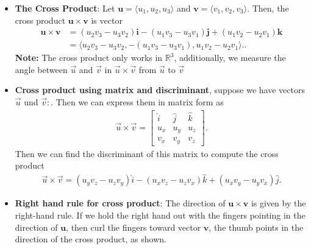 \documentclass{report}
\begin{document}
\begin{itemize}
            \item \textbf{The Cross Product}: 
                Let $\mathbf{u} = \langle u_1, u_2, u_3 \rangle$ and $\mathbf{v} = \langle v_1, v_2, v_3 \rangle$.
                Then, the cross product $\mathbf{u} \times \mathbf{v}$ is vector
                \begin{align*}
                    \mathbf{u} \times \mathbf{v} &= (u_2 v_3 - u_3 v_2) \mathbf{i} - (u_1 v_3 - u_3 v_1) \mathbf{j} + (u_1 v_2 - u_2 v_1) \mathbf{k}  \\
                                                 &= \langle u_2 v_3 - u_3 v_2, -(u_1 v_3 - u_3 v_1), u_1 v_2 - u_2 v_1 \rangle.
                .\end{align*}
                \bigbreak \noindent 
                \textbf{Note:} The cross product only works in $\mathbb{R}^{3}$, additionally, we measure the angle between $\vec{u}$ and $\vec{v}$ in $\vec{u} \times \vec{v}$ from $\vec{u}$ to $\vec{v}$
            \item \textbf{Cross product using matrix and discriminant}, suppose we have vectors $\vec{u}$ und $\vec{v}:$. Then we can express them in matrix form as
                \begin{align*}
                    \vec{u} \times \vec{v}  =
                    \begin{bmatrix}
                        \hat{i} & \hat{j} & \hat{k} \\
                        u_{x} & u_{y} & u_{z} \\
                        v_{x} & v_{y} & v_{z}
                    \end{bmatrix}
                .\end{align*}
                Then we can find the discriminant of this matrix to compute the cross product
                \begin{align*}
                    \vec{u} \times \vec{v} = (u_{y}v_{z} - u_{z}v_{y})\hat{i} - (u_{x}v_{z}-u_{z}v_{x})\hat{k} + (u_{x}v_{y} - u_{y}v_{x})\hat{j}
                .\end{align*}
            \item \textbf{Right hand rule for cross product}: 
                The direction of $\mathbf{u} \times \mathbf{v}$ is given by the right-hand rule. If we hold the right hand out with the fingers pointing in the direction of $\mathbf{u}$, then curl the fingers toward vector $\mathbf{v}$, the thumb points in the direction of the cross product, as shown.
                \bigbreak \noindent 

\end{itemize}
\end{document}
